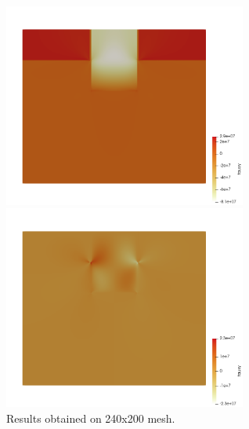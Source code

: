 \begin{center}
\includegraphics[width=8cm]{python_codes/fieldstone_160/results/tau_yy.png}
\includegraphics[width=8cm]{python_codes/fieldstone_160/results/tau_xy.png}\\
{\captionfont Results obtained on 240x200 mesh.}
\end{center}



